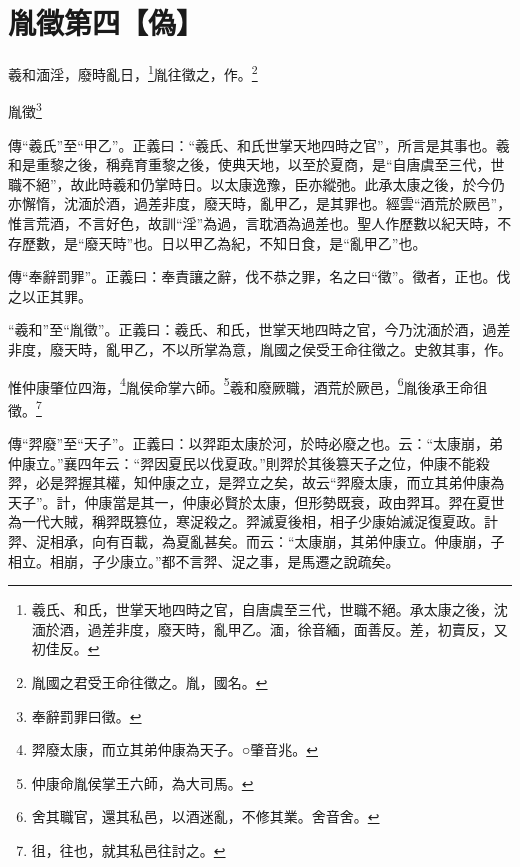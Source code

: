 \section{胤徵第四【偽】}


羲和湎淫，廢時亂日，\footnote{羲氏、和氏，世掌天地四時之官，自唐虞至三代，世職不絕。承太康之後，沈湎於酒，過差非度，廢天時，亂甲乙。湎，徐音緬，面善反。差，初賣反，又初佳反。}胤往徵之，作。\footnote{胤國之君受王命往徵之。胤，國名。}

胤徵\footnote{奉辭罰罪曰徵。}


{\noindent\zhuan{}\fzbyks 傳“羲氏”至“甲乙”。正義曰：“羲氏、和氏世掌天地四時之官”，所言是其事也。羲和是重黎之後，稱堯育重黎之後，使典天地，以至於夏商，是“自唐虞至三代，世職不絕”，故此時羲和仍掌時日。以太康逸豫，臣亦縱弛。此承太康之後，於今仍亦懈惰，沈湎於酒，過差非度，廢天時，亂甲乙，是其罪也。經雲“酒荒於厥邑”，惟言荒酒，不言好色，故訓“淫”為過，言耽酒為過差也。聖人作歷數以紀天時，不存歷數，是“廢天時”也。日以甲乙為紀，不知日食，是“亂甲乙”也。 \par}

{\noindent\zhuan{}\fzbyks 傳“奉辭罰罪”。正義曰：奉責讓之辭，伐不恭之罪，名之曰“徵”。徵者，正也。伐之以正其罪。 \par}

{\noindent\shu{}\fzkt “羲和”至“胤徵”。正義曰：羲氏、和氏，世掌天地四時之官，今乃沈湎於酒，過差非度，廢天時，亂甲乙，不以所掌為意，胤國之侯受王命往徵之。史敘其事，作。 \par}

惟仲康肇位四海，\footnote{羿廢太康，而立其弟仲康為天子。○肇音兆。}胤侯命掌六師。\footnote{仲康命胤侯掌王六師，為大司馬。}羲和廢厥職，酒荒於厥邑，\footnote{舍其職官，還其私邑，以酒迷亂，不修其業。舍音舍。}胤後承王命徂徵。\footnote{徂，往也，就其私邑往討之。}


{\noindent\zhuan{}\fzbyks 傳“羿廢”至“天子”。正義曰：以羿距太康於河，於時必廢之也。云：“太康崩，弟仲康立。”襄四年云：“羿因夏民以伐夏政。”則羿於其後篡天子之位，仲康不能殺羿，必是羿握其權，知仲康之立，是羿立之矣，故云“羿廢太康，而立其弟仲康為天子”。計，仲康當是其一，仲康必賢於太康，但形勢既衰，政由羿耳。羿在夏世為一代大賊，稱羿既篡位，寒浞殺之。羿滅夏後相，相子少康始滅浞復夏政。計羿、浞相承，向有百載，為夏亂甚矣。而云：“太康崩，其弟仲康立。仲康崩，子相立。相崩，子少康立。”都不言羿、浞之事，是馬遷之說疏矣。 \par}

